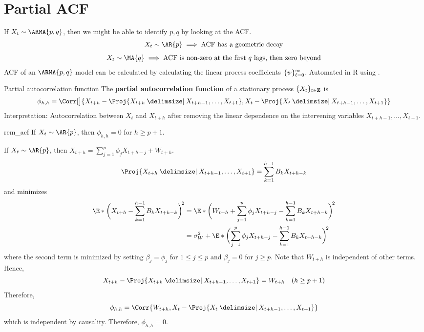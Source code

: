 \section{Partial ACF}
If $ X_t \sim \ARMA{p,q} $, then we might be able to identify
$ p,q $ by looking at the ACF\@.
\[ X_t \sim \AR{p}\implies\text{ACF has a geometric decay} \]
\[ X_t \sim \MA{q}\implies\text{ACF is non-zero at the first $q$ lags, then zero beyond} \]
ACF of an $ \ARMA{p,q} $ model can be calculated by calculating
the linear process coefficients $ \{\psi\}_{\ell=0}^\infty $.
Automated in R using .
\begin{Definition}{Partial autocorrelation function}{}
    The \textbf{partial autocorrelation function} of a stationary
    process $ \{X_t\}_{t\in\mathbf{Z}} $ is
    \[ \phi_{h,h}=\Corr[\big]{X_{t+h}-\Proj{X_{t+h}\onto X_{t+h-1},\ldots,X_{t+1}},
        X_{t}-\Proj{X_t\onto X_{t+h-1},\ldots,X_{t+1}}} \]
    Interpretation: Autocorrelation between $ X_t $ and $ X_{t+h} $
    after removing the linear dependence on the intervening variables $ X_{t+h-1},\ldots,X_{t+1} $.
\end{Definition}
\begin{Remark}{}{rem_acf}
    If $ X_t \sim \AR{p} $, then $ \phi_{h,h}=0 $ for $ h\ge p+1 $.
\end{Remark}
\begin{Proof}{}{}
    If $ X_t \sim \AR{p} $, then $ X_{t+h}=\sum_{j=1}^{p} \phi_j X_{t+h-j} +W_{t+h} $.
    \[ \Proj{X_{t+h}\onto X_{t+h-1},\ldots,X_{t+1}}=
        \sum_{k=1}^{h-1}B_k X_{t+h-k}  \]
    and minimizes
    \begin{align*}
        \E*{\biggl(X_{t+h}-\sum_{k=1}^{h-1} B_k X_{t+h-k}\biggr)^{\!2}}
         & =\E*{\biggl(W_{t+h}+\sum_{j=1}^{p} \phi_j X_{t+h-j}
        -\sum_{k=1}^{h-1} B_k X_{t+h-k}\biggr)^{\!2}}                                                          \\
         & =\sigma_W^2+\E*{\biggl(\sum_{j=1}^{p} \phi_j X_{t+h-j}-\sum_{k=1}^{h-1} B_k X_{t+h-k}\biggr)^{\!2}}
    \end{align*}
    where the second term is minimized by setting $ \beta_j=\phi_j $ for $ 1\le j\le p $
    and $ \beta_j=0 $ for $ j\ge p $. Note that $ W_{t+h} $ is independent of other terms.
    Hence,
    \[ X_{t+h}-\Proj{X_{t+h}\onto X_{t+h-1},\ldots,X_{t+1}}=W_{t+h}\quad(h\ge p+1) \]
    Therefore,
    \[ \phi_{h,h}=\Corr{W_{t+h},X_t-\Proj{X_t\onto X_{t+h-1},\ldots,X_{t+1}}} \]
    which is independent by causality. Therefore, $ \phi_{h,h}=0 $.
\end{Proof}
